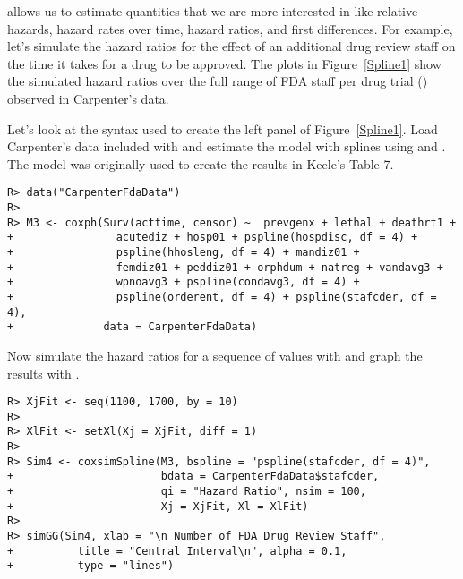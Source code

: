 \documentclass[nojss]{jss}\usepackage[]{graphicx}\usepackage[]{color}
\makeatletter
\newenvironment{kframe}{%
 \def\at@end@of@kframe{}%
 \ifinner\ifhmode%
  \def\at@end@of@kframe{\end{minipage}}%
  \begin{minipage}{\columnwidth}%
 \fi\fi%
 \def\FrameCommand##1{\hskip\@totalleftmargin \hskip-\fboxsep
 \colorbox{shadecolor}{##1}\hskip-\fboxsep
     \hskip-\linewidth \hskip-\@totalleftmargin \hskip\columnwidth}%
 \MakeFramed {\advance\hsize-\width
   \@totalleftmargin\z@ \linewidth\hsize
   \@setminipage}}%
 {\par\unskip\endMakeFramed%
 \at@end@of@kframe}
\newenvironment{knitrout}{}{} %
\makeatother
\begin{document}
 allows us to estimate quantities that we are more interested in like relative hazards, hazard rates over time, hazard ratios, and first differences. For example, let's simulate the hazard ratios for the effect of an additional drug review staff on the time it takes for a drug to be approved. The plots in Figure~\ref{Spline1} show the simulated hazard ratios over the full range of FDA staff per drug trial () observed in Carpenter's data.

Let's look at the syntax used to create the left panel of Figure~\ref{Spline1}. Load Carpenter's data included with  and estimate the model with splines using  and . The model was originally used to create the results in Keele's \citeyearpar{Keele2010} Table 7.

\begin{knitrout}
\color{fgcolor}\begin{kframe}
\begin{verbatim}
R> data("CarpenterFdaData")
R> 
R> M3 <- coxph(Surv(acttime, censor) ~  prevgenx + lethal + deathrt1 +
+                acutediz + hosp01 + pspline(hospdisc, df = 4) +
+                pspline(hhosleng, df = 4) + mandiz01 +
+                femdiz01 + peddiz01 + orphdum + natreg + vandavg3 +
+                wpnoavg3 + pspline(condavg3, df = 4) +
+                pspline(orderent, df = 4) + pspline(stafcder, df = 4),
+              data = CarpenterFdaData)
\end{verbatim}
\end{kframe}
\end{knitrout}

Now simulate the hazard ratios for a sequence of values with  and graph the results with .

\begin{knitrout}
\color{fgcolor}\begin{kframe}
\begin{verbatim}
R> XjFit <- seq(1100, 1700, by = 10)
R> 
R> XlFit <- setXl(Xj = XjFit, diff = 1)
R> 
R> Sim4 <- coxsimSpline(M3, bspline = "pspline(stafcder, df = 4)",
+                       bdata = CarpenterFdaData$stafcder,
+                       qi = "Hazard Ratio", nsim = 100,
+                       Xj = XjFit, Xl = XlFit)
R> 
R> simGG(Sim4, xlab = "\n Number of FDA Drug Review Staff",
+          title = "Central Interval\n", alpha = 0.1,
+          type = "lines")
\end{verbatim}
\end{kframe}
\end{knitrout}
\end{document}
